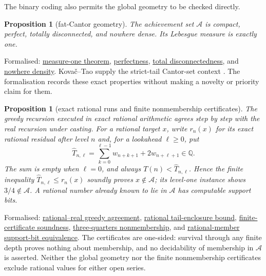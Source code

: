 \documentclass[11pt]{article}
\newcommand{\commit}{312b96c0d149ed466725c62d4ef24cfc91bca34e}
\newcommand{\repobase}{https://github.com/wcook04/plectis-lean-erdos249-257/blob/\commit}
\newcommand{\PK}{Erdos249257}
\newcommand{\lword}[4]{\href{\repobase/\PK/#1\#L#2}{#4}}
\newtheorem{proposition}[theorem]{Proposition}
\theoremstyle{definition}
\theoremstyle{remark}
\newcommand{\Q}{\mathbb{Q}}
\begin{document}
The binary coding also permits the global geometry to be checked directly.

\begin{proposition}[fat-Cantor geometry]\label{res:greedytopology}
The achievement set $\mathcal A$ is compact, perfect, totally disconnected,
and nowhere dense.  Its Lebesgue measure is exactly one.
\end{proposition}
\noindent Formalised:
\lword{GreedyAchievementSet.lean}{996}{volume_mersenneAchievementSet}{measure-one theorem},
\lword{GreedyAchievementSet.lean}{1620}{perfect_mersenneAchievementSet}{perfectness},
\lword{GreedyAchievementSet.lean}{1636}{isTotallyDisconnected_mersenneAchievementSet}{total disconnectedness},
and
\lword{GreedyAchievementSet.lean}{1645}{isNowhereDense_mersenneAchievementSet}{nowhere density}.
Kova\v{c}--Tao supply the strict-tail Cantor-set context
\cite[Remark~4.1]{kovactao}.  The
formalisation records these exact properties without making a novelty or
priority claim for them.

\begin{proposition}[exact rational runs and finite nonmembership certificates]\label{res:death}
The greedy recursion executed in exact rational arithmetic agrees step by step
with the real recursion under casting. For a rational target $x$, write
$r_n(x)$ for its exact rational residual after level $n$ and, for a lookahead
$\ell\ge0$, put
\[
\widehat T_{n,\ell}
  =\sum_{k=0}^{\ell-1}w_{n+k+1}+2w_{n+\ell+1}\in\Q .
\]
The sum is empty when $\ell=0$, and always
$T(n)<\widehat T_{n,\ell}$. Hence the finite inequality
$\widehat T_{n,\ell}\le r_n(x)$ soundly proves $x\notin\mathcal A$; its
level-one instance shows $3/4\notin\mathcal A$. A rational number already
known to lie in $\mathcal A$ has computable support bits.
\end{proposition}
\noindent Formalised:
\lword{GreedyAchievementSet.lean}{1130}{cast_greedyMersenneRemainderRat}{rational--real greedy agreement},
\lword{GreedyAchievementSet.lean}{1692}{mersenneTail_lt_cast_tailUpperRat}{rational tail-enclosure bound},
\lword{GreedyAchievementSet.lean}{1726}{certifiedGreedyMersenneDeath_not_mem}{finite-certificate soundness},
\lword{GreedyAchievementSet.lean}{1748}{three_fourths_not_mem_mersenneAchievementSet}{three-quarters nonmembership},
and \lword{GreedyAchievementSet.lean}{1832}{rational_member_support_bit_iff}{rational-member support-bit equivalence}.
The certificates are one-sided: survival through any finite depth proves
nothing about membership, and no decidability of membership in $\mathcal A$ is
asserted.  Neither the global geometry nor the finite nonmembership certificates
exclude rational values for either open series.
\end{document}
